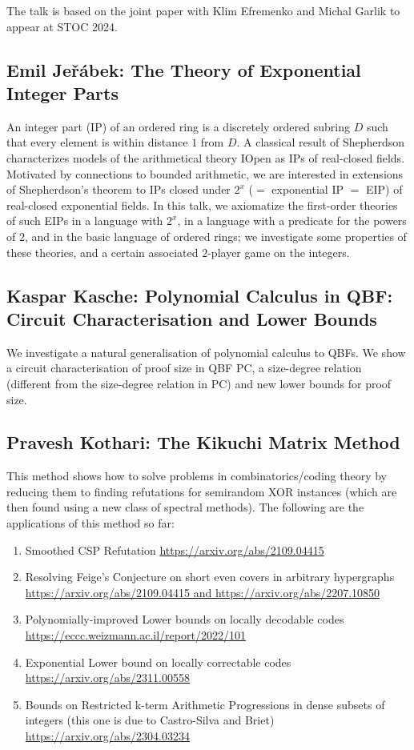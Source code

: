 \documentclass[11pt]{article}
\begin{document}
The talk is based on the joint paper with Klim Efremenko and Michal Garlik to appear at STOC 2024.

\subsection*{Emil Je\v{r}\'{a}bek: The Theory of Exponential Integer Parts}\label{Jerabek}

An integer part (IP) of an ordered ring is a discretely ordered
subring $D$ such that every element is within distance $1$ from $D$.
A classical result of Shepherdson characterizes models of the
arithmetical theory IOpen as IPs of real-closed fields. Motivated by
connections to bounded arithmetic, we are interested in extensions of
Shepherdson's theorem to IPs closed under $2^x$ ($=$ exponential IP $=$ EIP)
of real-closed exponential fields. In this talk, we axiomatize the
first-order theories of such EIPs in a language with $2^x$, in a language
with a predicate for the powers of $2$, and in the basic language of
ordered rings; we investigate some properties of these theories, and
a certain associated $2$-player game on the integers.


\subsection*{Kaspar Kasche: Polynomial Calculus in QBF: Circuit Characterisation and
Lower Bounds}\label{Kasche}

We investigate a natural generalisation of polynomial calculus to QBFs. We show a circuit characterisation of proof size in QBF PC, a size-degree relation (different from the size-degree relation in PC) and new lower bounds for proof size. 

\subsection*{Pravesh Kothari: The Kikuchi Matrix Method}\label{Kothari}

This method shows how to solve problems in combinatorics/coding theory by reducing them to finding refutations for semirandom XOR instances (which are then found using a new class of spectral methods). The following are the applications of this method so far:
\begin{enumerate}
\item Smoothed CSP Refutation \url{https://arxiv.org/abs/2109.04415} 
\item Resolving Feige's Conjecture on short even covers in arbitrary hypergraphs \url{https://arxiv.org/abs/2109.04415 and https://arxiv.org/abs/2207.10850} 
\item Polynomially-improved Lower bounds on locally decodable codes \url{https://eccc.weizmann.ac.il/report/2022/101} 
\item Exponential Lower bound on locally correctable codes \url{https://arxiv.org/abs/2311.00558} 
\item Bounds on Restricted k-term Arithmetic Progressions in dense subsets of integers (this one is due to Castro-Silva and Briet) \url{https://arxiv.org/abs/2304.03234}
\end{enumerate}
\end{document}
